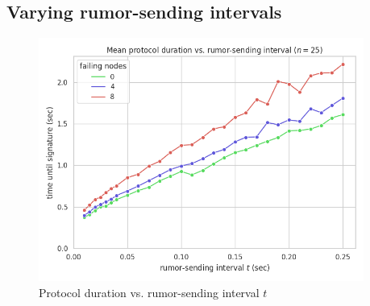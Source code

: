 \subsection*{Varying rumor-sending intervals}

\begin{figure}[H]
    \centering
    \includegraphics[width=0.95\textwidth]{figures/6/round_wall_sum_by_gossip_tick.png}
    \captionsetup{labelformat=empty}
    \caption{Protocol duration vs. rumor-sending interval $t$}
\end{figure}

